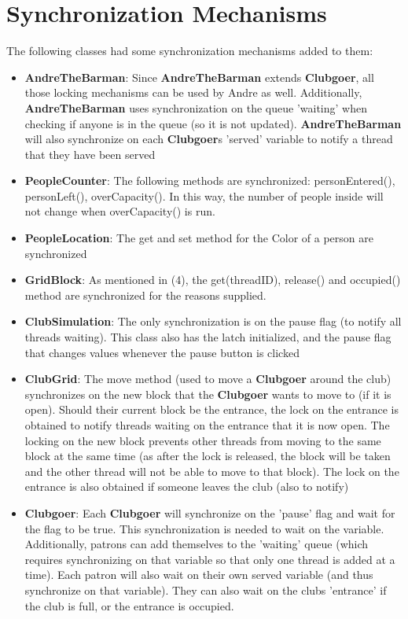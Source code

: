 \documentclass{assignment}
\begin{document}
\section{Synchronization Mechanisms}
The following classes had some synchronization mechanisms added to them: \\
\begin{itemize}
    \item {\textbf{AndreTheBarman}: Since \textbf{AndreTheBarman} extends \textbf{Clubgoer}, all those locking mechanisms can be used by Andre as well. Additionally, \textbf{AndreTheBarman} uses synchronization on the queue 'waiting' when checking if anyone is in the queue (so it is not updated). \textbf{AndreTheBarman} will also synchronize on each \textbf{Clubgoer}s 'served' variable to notify a thread that they have been served }
    \item {\textbf{PeopleCounter}: The following methods are synchronized: personEntered(), personLeft(), overCapacity(). In this way, the number of people inside will not change when overCapacity() is run.}
    \item {\textbf{PeopleLocation}: The get and set method for the Color of a person are synchronized}
    \item {\textbf{GridBlock}: As mentioned in (4), the get(threadID), release() and occupied() method are synchronized for the reasons supplied. }
    \item{\textbf{ClubSimulation}: The only synchronization is on the pause flag (to notify all threads waiting). This class also has the latch initialized, and the pause flag that changes values whenever the pause button is clicked}
    \item{\textbf{ClubGrid}: The move method (used to move a \textbf{Clubgoer} around the club) synchronizes on the new block that the \textbf{Clubgoer} wants to move to (if it is open). Should their current block be the entrance, the lock on the entrance is obtained to notify threads waiting on the entrance that it is now open. The locking on the new block prevents other threads from moving to the same block at the same time (as after the lock is released, the block will be taken and the other thread will not be able to move to that block). The lock on the entrance is also obtained if someone leaves the club (also to notify)}
    \item {\textbf{Clubgoer}: Each \textbf{Clubgoer} will synchronize on the 'pause' flag and wait for the flag to be true. This synchronization is needed to wait on the variable. Additionally, patrons can add themselves to the 'waiting' queue (which requires synchronizing on that variable so that only one thread is added at a time). Each patron will also wait on their own served variable (and thus synchronize on that variable). They can also wait on the clubs 'entrance' if the club is full, or the entrance is occupied.}
\end{itemize}
\end{document}
